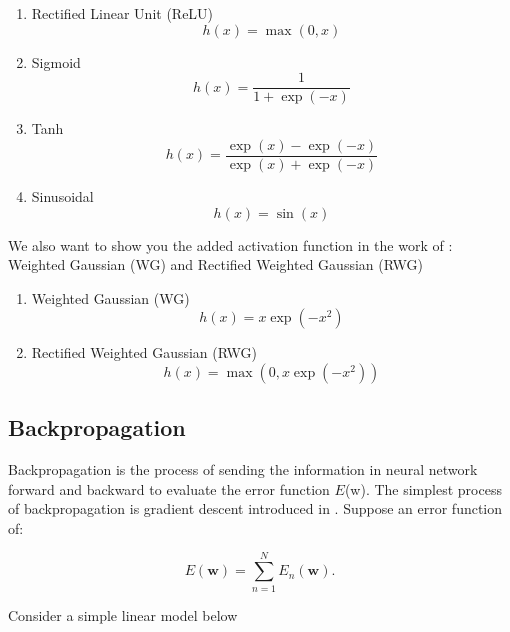 \documentclass[ %
                    author={Revalda Putawara},
                supervisor={Dr. James Pope},
                    degree={MSc},
                     title={Robustness of Bayesian Neural Networks Design Choices Against Weight and Bias Perturbation Induced by Single Event Upsets (SEUs)},
                      type={},
                      year={2025}]{dissertation}
\begin{document}
\begin{enumerate}
\item Rectified Linear Unit (ReLU)
\begin{equation}
h(x) = \max(0, x)
\end{equation}
\item Sigmoid
\begin{equation}
h(x) = \frac{1}{1+\exp(-x)}
\end{equation}
\item Tanh
\begin{equation}
h(x) = \frac{\exp(x)-\exp(-x)}{\exp(x)+\exp(-x)}
\end{equation}
\item Sinusoidal
\begin{equation}
h(x) = \sin(x)
\end{equation}
\end{enumerate}


We also want to show you the added activation function in the work of \cite{dennispoperobustcnn}: Weighted Gaussian (WG) and Rectified Weighted Gaussian (RWG)

\begin{enumerate}
\item Weighted Gaussian (WG)
\begin{equation}
h(x) = x \exp(-x^{2})
\end{equation}
\item Rectified Weighted Gaussian (RWG)
\begin{equation}
h(x) = \max(0, x \exp(-x^{2}))
\end{equation}
\end{enumerate}

\subsection{Backpropagation}

Backpropagation is the process of sending the information in neural network forward and backward to evaluate the error function $E$(w). The simplest process of backpropagation is gradient descent introduced in \cite{RumelhartHintonWilliams1986}. Suppose an error function of:


\begin{equation}
E(\mathbf{w}) = \sum_{n=1}^{N} E_n(\mathbf{w}).
\end{equation}

Consider a simple linear model below
\end{document}
